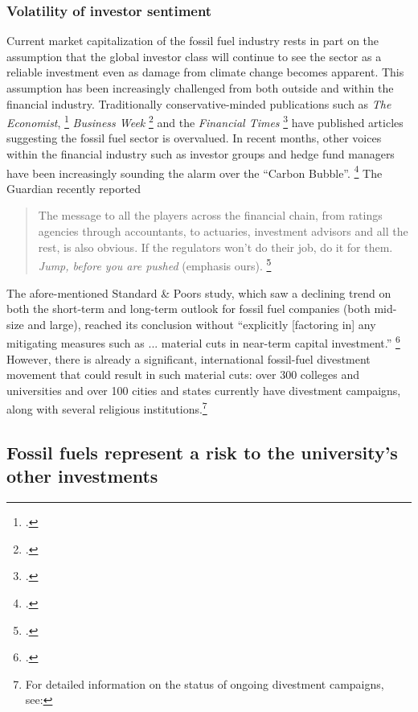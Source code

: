 \subsubsection {Volatility of investor sentiment}



Current market capitalization of the fossil fuel industry rests in part on the assumption that the global investor class will continue to see the sector as a reliable investment even as damage from climate change becomes apparent. 
This assumption has been increasingly challenged from both outside and within the financial industry. 
Traditionally conservative-minded publications such as \emph{The Economist}, \footcite{EconomistUnburnable} \emph{Business Week} \footcite{BusinessWeekOvervalued} and the \emph{Financial Times} \footcite{FTOvervalued} have published articles suggesting the fossil fuel sector is overvalued. 
In recent months, other voices within the financial industry such as investor groups and hedge fund managers have been increasingly sounding the alarm over the ``Carbon Bubble''. \footcite{JeremyGrantham} 
The Guardian recently reported
\begin{quote}
The message to all the players across the financial chain, from ratings agencies through accountants, to actuaries, investment advisors and all the rest, is also obvious. If the regulators won't do their job, do it for them. \emph{Jump, before you are pushed} (emphasis ours). \footcite{Guardian6Trillion}
\end{quote}
The afore-mentioned Standard \& Poors study, which saw a declining trend on both the short-term and long-term outlook for fossil fuel companies (both mid-size and large), reached its conclusion without ``explicitly [factoring in] any mitigating measures such as ... material cuts in near-term capital investment.'' \footcite{SandPConstrained}
However, there is already a significant, international fossil-fuel divestment movement that could result in such material cuts: over 300 colleges and universities and over 100 cities and states currently have divestment campaigns, along with several religious institutions.\footnote{For detailed information on the status of ongoing divestment campaigns, see: }




	\subsection {Fossil fuels represent a risk to the university's other investments}



